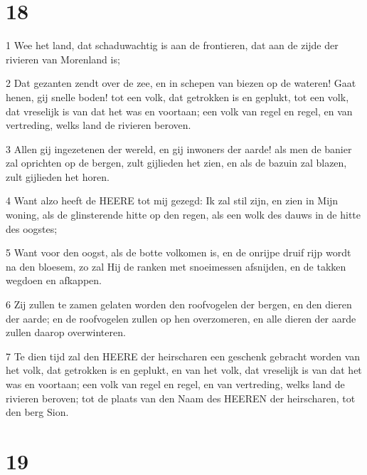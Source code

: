 \chapter{18}

\par 1 Wee het land, dat schaduwachtig is aan de frontieren, dat aan de zijde der rivieren van Morenland is;
\par 2 Dat gezanten zendt over de zee, en in schepen van biezen op de wateren! Gaat henen, gij snelle boden! tot een volk, dat getrokken is en geplukt, tot een volk, dat vreselijk is van dat het was en voortaan; een volk van regel en regel, en van vertreding, welks land de rivieren beroven.
\par 3 Allen gij ingezetenen der wereld, en gij inwoners der aarde! als men de banier zal oprichten op de bergen, zult gijlieden het zien, en als de bazuin zal blazen, zult gijlieden het horen.
\par 4 Want alzo heeft de HEERE tot mij gezegd: Ik zal stil zijn, en zien in Mijn woning, als de glinsterende hitte op den regen, als een wolk des dauws in de hitte des oogstes;
\par 5 Want voor den oogst, als de botte volkomen is, en de onrijpe druif rijp wordt na den bloesem, zo zal Hij de ranken met snoeimessen afsnijden, en de takken wegdoen en afkappen.
\par 6 Zij zullen te zamen gelaten worden den roofvogelen der bergen, en den dieren der aarde; en de roofvogelen zullen op hen overzomeren, en alle dieren der aarde zullen daarop overwinteren.
\par 7 Te dien tijd zal den HEERE der heirscharen een geschenk gebracht worden van het volk, dat getrokken is en geplukt, en van het volk, dat vreselijk is van dat het was en voortaan; een volk van regel en regel, en van vertreding, welks land de rivieren beroven; tot de plaats van den Naam des HEEREN der heirscharen, tot den berg Sion.

\chapter{19}

